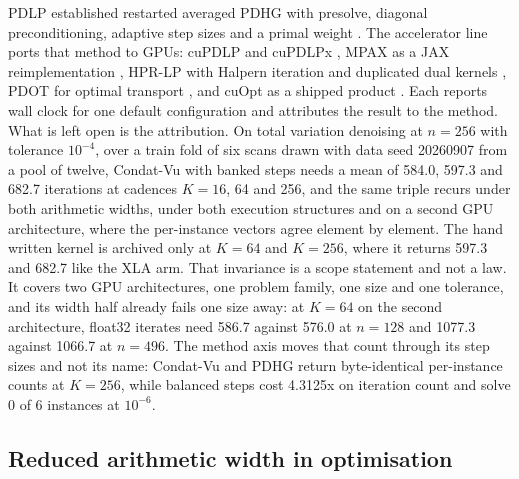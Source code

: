 PDLP established restarted averaged PDHG with presolve, diagonal
preconditioning, adaptive step sizes and a primal weight
\citep{Applegate2021Practical}. The accelerator line ports that method to GPUs:
cuPDLP and cuPDLPx \citep{Lu2026cuPDLP,Lu2026cuPDLPx}, MPAX as a JAX
reimplementation \citep{Lu2026MPAX}, HPR-LP with Halpern iteration and
duplicated dual kernels \citep{Lu2024HPRLP}, PDOT for optimal transport
\citep{PDOT2024}, and cuOpt as a shipped product \citep{cuOpt2026}. Each reports
wall clock for one default configuration and attributes the result to the
method. What is left open is the attribution.
On total variation denoising at $n=256$ with tolerance $10^{-4}$, over a train
fold of six scans drawn with data seed 20260907 from a pool of twelve,
Condat-Vu with banked steps needs a mean of 584.0, 597.3 and 682.7 iterations
at cadences $K=16$, 64 and 256, and the same triple recurs under both
arithmetic widths, under both execution structures and on a second GPU
architecture, where the per-instance vectors agree element by element.
The hand written kernel is archived only at $K=64$ and $K=256$, where it
returns 597.3 and 682.7 like the XLA arm.
That invariance is a scope statement and not a law. It covers two GPU
architectures, one problem family, one size and one tolerance, and its width
half already fails one size away: at $K=64$ on the second architecture, float32 iterates
need 586.7 against 576.0 at $n=128$ and 1077.3 against 1066.7 at $n=496$.
The method axis moves that count through its step sizes and not its name:
Condat-Vu and PDHG return byte-identical per-instance counts at $K=256$, while
balanced steps cost 4.3125x on iteration count and solve 0 of 6 instances at
$10^{-6}$.

\subsection{Reduced arithmetic width in optimisation}

